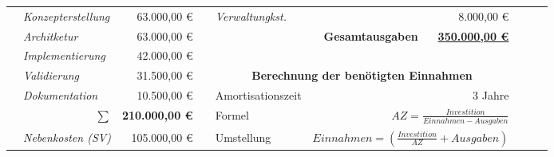 \begin{sidewaystable}
\begin{tabular}{llrlllrlll}
\multicolumn{1}{|l}{}                      & \multicolumn{1}{l|}{\textit{Konzepterstellung}} & \multicolumn{1}{r|}{63.000,00 \euro}                 & \multicolumn{1}{l|}{} & \textit{Verwaltungkst.}  & \multicolumn{1}{l|}{}                        & \multicolumn{1}{r|}{8.000,00 \euro}                  &  &  &  \\ \cline{5-7}
\multicolumn{1}{|l}{}                      & \multicolumn{1}{l|}{\textit{Architketur}}       & \multicolumn{1}{r|}{63.000,00 \euro}                 & \multicolumn{1}{l|}{} &                          & \multicolumn{1}{r|}{\textbf{Gesamtausgaben}} & \multicolumn{1}{r|}{{\ul \textbf{350.000,00 \euro}}} &  &  &  \\ \cline{5-7}
\multicolumn{1}{|l}{}                      & \multicolumn{1}{l|}{\textit{Implementierung}}   & \multicolumn{1}{r|}{42.000,00 \euro}                 &                       &                          &                                              & \multicolumn{1}{l}{}                             &  &  &  \\ \cline{5-7}
\multicolumn{1}{|l}{}                      & \multicolumn{1}{l|}{\textit{Validierung}}       & \multicolumn{1}{r|}{31.500,00 \euro}                 & \multicolumn{1}{l|}{} & \multicolumn{3}{c|}{\textbf{Berechnung der benötigten Einnahmen}}                                                          &  &  &  \\ \cline{5-7}
\multicolumn{1}{|l}{}                      & \multicolumn{1}{l|}{\textit{Dokumentation}}     & \multicolumn{1}{r|}{10.500,00 \euro}                 & \multicolumn{1}{l|}{} & Amortisationszeit        & \multicolumn{1}{r}{}                         & \multicolumn{1}{r|}{3 Jahre}                     &  &  &  \\
\multicolumn{1}{|l}{}                      & \multicolumn{1}{r|}{\textit{$\sum$}}                 & \multicolumn{1}{r|}{\textbf{210.000,00 \euro}}       & \multicolumn{1}{l|}{} & Formel                   & \multicolumn{2}{r|}{$AZ = \frac{Investition}{Einnahmen-Ausgaben}$}                                                                          &  &  &  \\
\multicolumn{1}{|l}{}                      & \multicolumn{1}{l|}{\textit{Nebenkosten (SV)}}       & \multicolumn{1}{r|}{105.000,00 \euro}                & \multicolumn{1}{l|}{} & Umstellung               & \multicolumn{2}{r|}{$Einnahmen = (\frac{Investition}{AZ} + Ausgaben)$}                                                                          &  &  &  \\

\end{tabular}
\end{sidewaystable}

